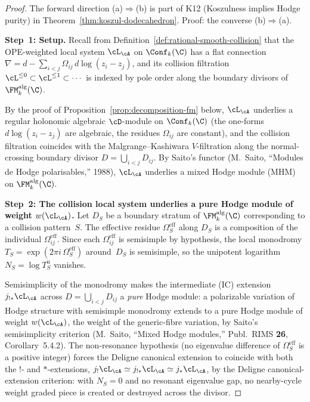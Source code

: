 \begin{proof}
The forward direction (a)$\Rightarrow$(b) is part of K12
(Koszulness implies Hodge purity) in
Theorem~\ref{thm:koszul-dodecahedron}. Proof: the converse
(b)$\Rightarrow$(a).

\medskip\noindent\textbf{Step~1: Setup.}
Recall from Definition~\ref{def:rational-smooth-collision}
that the OPE-weighted local system
$\cL_\cA$ on $\Conf_k(\C)$ has a flat connection
$\nabla = d - \sum_{i<j}\Omega_{ij}\,d\log(z_i - z_j)$,
and its collision filtration
$\cL^{\leq 0} \subset \cL^{\leq 1} \subset \cdots$
is indexed by pole order along the boundary divisors of
$\FM_k^{\mathrm{alg}}(\C)$.

By the proof of Proposition~\ref{prop:decomposition-fm} below,
$\cL_\cA$ underlies a regular holonomic algebraic
$\cD$-module on $\Conf_k(\C)$ (the one-forms $d\log(z_i-z_j)$
are algebraic, the residues $\Omega_{ij}$ are constant), and the
collision filtration coincides with the Malgrange--Kashiwara
$V$-filtration along the normal-crossing boundary
divisor $D = \bigcup_{i<j}D_{ij}$. By Saito's functor
(M.~Saito, ``Modules de Hodge polarisables,'' 1988),
$\cL_\cA$ underlies a mixed Hodge module (MHM) on
$\FM_k^{\mathrm{alg}}(\C)$.

\medskip\noindent\textbf{Step~2: The collision local system underlies
a pure Hodge module of weight $w(\cL_\cA)$.}
Let $D_S$ be a boundary stratum of
$\FM_k^{\mathrm{alg}}(\C)$ corresponding to a collision pattern~$S$.
The effective residue $\Omega_S^{\mathrm{eff}}$ along $D_S$
is a composition of the individual $\Omega_{ij}^{\mathrm{eff}}$.
Since each $\Omega_{ij}^{\mathrm{eff}}$ is semisimple
by hypothesis, the local monodromy $T_S = \exp(2\pi i\,
\Omega_S^{\mathrm{eff}})$ around~$D_S$ is semisimple, so the
unipotent logarithm $N_S = \log T_S^{\mathrm u}$ vanishes.

Semisimplicity of the monodromy makes the intermediate (IC) extension
$j_{!*}\cL_\cA$ across $D = \bigcup_{i<j}D_{ij}$ a \emph{pure} Hodge
module: a polarizable variation of Hodge structure with semisimple
monodromy extends to a pure Hodge module of weight $w(\cL_\cA)$, the
weight of the generic-fibre variation, by Saito's semisimplicity
criterion (M.~Saito, ``Mixed Hodge modules,'' Publ.\ RIMS \textbf{26},
Corollary~5.4.2). The non-resonance hypothesis (no eigenvalue
difference of $\Omega_S^{\mathrm{eff}}$ is a positive integer) forces
the Deligne canonical extension to coincide with both the
$!$- and $*$-extensions, $j_!\cL_\cA \simeq j_{!*}\cL_\cA \simeq
j_*\cL_\cA$, by the Deligne canonical-extension criterion: with
$N_S = 0$ and no resonant eigenvalue gap, no nearby-cycle weight
graded piece is created or destroyed across the divisor.


\end{proof}
